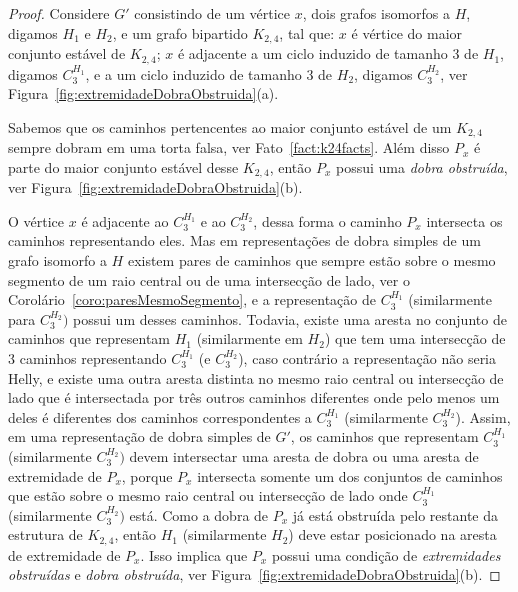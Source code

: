\begin{proof}
Considere $G'$ consistindo de um vértice $x$, dois grafos isomorfos a  $H$, digamos $ H_1 $ e $ H_2 $, e um grafo bipartido $K_{2,4}$, tal que: $x$ é vértice do maior conjunto estável de $K_{2,4}$; $x$ é adjacente a um ciclo induzido de tamanho 3 de $H_1$, digamos $C_3^{H_1}$, e a um ciclo induzido de tamanho  3 de $H_2$, digamos $ C_3^{H_2}$, ver Figura~\ref{fig:extremidadeDobraObstruida}(a).

Sabemos que os caminhos pertencentes ao maior conjunto estável de um $K_{2,4}$ sempre dobram em uma  torta falsa, ver Fato~\ref{fact:k24facts}. Além disso $P_x$ é parte do maior conjunto estável desse  $K_{2,4}$, então $P_x$ possui uma \emph {dobra obstruída}, ver Figura~\ref{fig:extremidadeDobraObstruida}(b). 

O vértice  $x$ é adjacente ao $ C_{3}^{H_1}$ e ao $ C_3^{H_2}$, dessa forma o caminho $ P_x $ intersecta os caminhos representando eles. Mas em representações de dobra simples de um grafo isomorfo a $H$ existem pares de caminhos que sempre estão sobre o mesmo segmento de um raio central ou de uma intersecção de lado, ver o Corolário~\ref{coro:paresMesmoSegmento}, e a representação de  $C_{3}^{H_1}$ (similarmente para $C_3^{H_2})$ possui um desses caminhos. Todavia, existe uma aresta no conjunto de caminhos que representam  ${H_1}$ (similarmente em ${H_2}$) que tem uma intersecção de   3 caminhos representando $ C_{3}^{H_1}$ (e $ C_3^{H_2}$), caso contrário a representação não seria Helly, e existe  uma outra aresta distinta no mesmo  raio central ou intersecção de lado que é intersectada por três outros caminhos diferentes onde pelo menos um deles é diferentes dos caminhos correspondentes a $C_{3}^{H_1}$ (similarmente $C_3^{H_2}$). Assim, em uma representação de dobra simples de  $G'$, os caminhos que representam  $C_{3}^{H_1}$ (similarmente $C_3^{H_2})$ devem intersectar uma aresta de dobra ou uma aresta de extremidade de $P_x$, porque $P_x$ intersecta somente um dos conjuntos de caminhos que estão sobre o mesmo raio central ou intersecção de lado onde  $C_{3}^{H_1}$ (similarmente $C_3^{H_2})$ está. Como a dobra de   $P_x$ já está obstruída pelo restante da estrutura de $K_{2,4}$, então ${H_1}$ (similarmente ${H_2}$) deve estar posicionado na aresta de extremidade de  $P_x$. Isso implica que  $ P_x $ possui uma condição de \emph{extremidades obstruídas} e \emph{dobra obstruída}, ver Figura~\ref{fig:extremidadeDobraObstruida}(b).

\end{proof}




